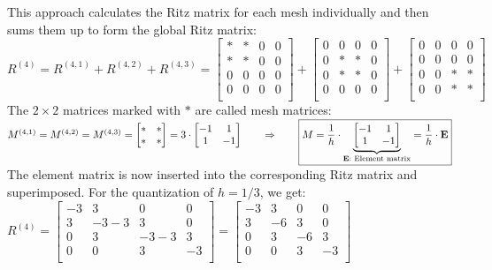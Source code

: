  This approach calculates the Ritz matrix for each mesh individually and
 then sums them up to form the global Ritz matrix:\\

\qquad $R^{(4)}=R^{(4,1)}+R^{(4,2)}+R^{(4,3)}=
\begin{bmatrix}
	* & * & 0 & 0\\
	* & * & 0 & 0\\
	0 & 0 & 0 & 0\\
	0 & 0 & 0 & 0\\
\end{bmatrix}+
\begin{bmatrix}
	0 & 0 & 0 & 0\\
	0 & * & * & 0\\
	0 & * & * & 0\\
	0 & 0 & 0 & 0\\
\end{bmatrix}+
\begin{bmatrix}
	0 & 0 & 0 & 0\\
	0 & 0 & 0 & 0\\
	0 & 0 & * & *\\
	0 & 0 & * & *\\
\end{bmatrix}
$\\

The $2\times 2$ matrices marked with $*$ are called mesh matrices:\\

$M^{(4,1)}=M^{(4,2)}=M^{(4,3)}=
\begin{bmatrix}
	* & *\\
	* & *\\
\end{bmatrix}=3\cdot\begin{bmatrix}
	-1 & 1\\
	1 & -1\\
\end{bmatrix}\qquad\Rightarrow\qquad\boxed{M=\frac 1h\cdot
\underset{\text{\textbf{E}: Element matrix}}{\underbrace{\begin{bmatrix}
	-1 & 1\\
	1 & -1\\
\end{bmatrix}}}=\frac 1h\cdot \mathbf{E}}$\\

The element matrix is now inserted into the corresponding Ritz matrix and superimposed.
For the quantization of $h=1/3$, we get:\\

$R^{(4)}=
\begin{bmatrix}
	-3 & 3 & 0 & 0 \\
	3 & -3-3 & 3 & 0 \\
	0 & 3 & -3-3 & 3 \\
	0 & 0 & 3 & -3 \\
\end{bmatrix}=
\begin{bmatrix}
	-3 & 3 & 0 & 0 \\
	3 & -6 & 3 & 0 \\
	0 & 3 & -6 & 3 \\
	0 & 0 & 3 & -3 \\
\end{bmatrix}$\\

